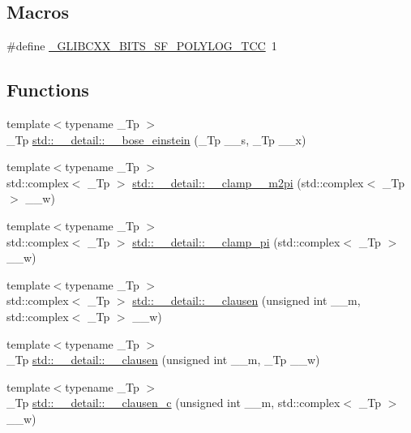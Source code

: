 \subsection*{Macros}
\begin{DoxyCompactItemize}
\item 
\#define \hyperlink{sf__polylog_8tcc_ab6c10ff949c404f48f72645a3fe8a674}{\+\_\+\+G\+L\+I\+B\+C\+X\+X\+\_\+\+B\+I\+T\+S\+\_\+\+S\+F\+\_\+\+P\+O\+L\+Y\+L\+O\+G\+\_\+\+T\+C\+C}~1
\end{DoxyCompactItemize}
\subsection*{Functions}
\begin{DoxyCompactItemize}
\item 
{\footnotesize template$<$typename \+\_\+\+Tp $>$ }\\\+\_\+\+Tp \hyperlink{namespacestd_1_1____detail_a4c199ebf92e53a3ae9c27c2c79d65e21}{std\+::\+\_\+\+\_\+detail\+::\+\_\+\+\_\+bose\+\_\+einstein} (\+\_\+\+Tp \+\_\+\+\_\+s, \+\_\+\+Tp \+\_\+\+\_\+x)
\item 
{\footnotesize template$<$typename \+\_\+\+Tp $>$ }\\std\+::complex$<$ \+\_\+\+Tp $>$ \hyperlink{namespacestd_1_1____detail_a49702394cf9b45acfa5b84f232078a9b}{std\+::\+\_\+\+\_\+detail\+::\+\_\+\+\_\+clamp\+\_\+\_\+m2pi} (std\+::complex$<$ \+\_\+\+Tp $>$ \+\_\+\+\_\+w)
\item 
{\footnotesize template$<$typename \+\_\+\+Tp $>$ }\\std\+::complex$<$ \+\_\+\+Tp $>$ \hyperlink{namespacestd_1_1____detail_afc1fa8ae4623bdc71b3bf21671f68e38}{std\+::\+\_\+\+\_\+detail\+::\+\_\+\+\_\+clamp\+\_\+pi} (std\+::complex$<$ \+\_\+\+Tp $>$ \+\_\+\+\_\+w)
\item 
{\footnotesize template$<$typename \+\_\+\+Tp $>$ }\\std\+::complex$<$ \+\_\+\+Tp $>$ \hyperlink{namespacestd_1_1____detail_a260f2c50d0164a55dab6a95217ced893}{std\+::\+\_\+\+\_\+detail\+::\+\_\+\+\_\+clausen} (unsigned int \+\_\+\+\_\+m, std\+::complex$<$ \+\_\+\+Tp $>$ \+\_\+\+\_\+w)
\item 
{\footnotesize template$<$typename \+\_\+\+Tp $>$ }\\\+\_\+\+Tp \hyperlink{namespacestd_1_1____detail_a12dab8bfc7bc5554fe0db5d1777d9887}{std\+::\+\_\+\+\_\+detail\+::\+\_\+\+\_\+clausen} (unsigned int \+\_\+\+\_\+m, \+\_\+\+Tp \+\_\+\+\_\+w)
\item 
{\footnotesize template$<$typename \+\_\+\+Tp $>$ }\\\+\_\+\+Tp \hyperlink{namespacestd_1_1____detail_a06b95eeefe47e8899e2e0a6bbd3ad31b}{std\+::\+\_\+\+\_\+detail\+::\+\_\+\+\_\+clausen\+\_\+c} (unsigned int \+\_\+\+\_\+m, std\+::complex$<$ \+\_\+\+Tp $>$ \+\_\+\+\_\+w)

\end{DoxyCompactItemize}
